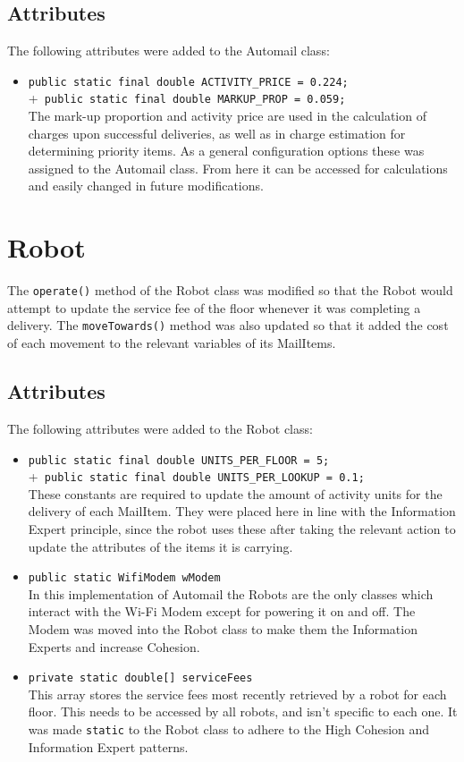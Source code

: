 \documentclass{article}
\begin{document}
\subsection{Attributes}
The following attributes were added to the Automail class:
\begin{itemize}
    \item \verb|public static final double ACTIVITY_PRICE = 0.224;|\\
         +\verb| public static final double MARKUP_PROP = 0.059;|\\[2mm]
    The mark-up proportion and activity price are used in the calculation of charges upon successful deliveries, as well as in charge estimation for determining priority items. As a general configuration options these was assigned to the Automail class. From here it can be accessed for calculations and easily changed in future modifications.
\end{itemize}

\section{Robot}
The \verb|operate()| method of the Robot class was modified so that the Robot would attempt to update the service fee of the floor whenever it was completing a delivery. The \verb|moveTowards()| method was also updated so that it added the cost of each movement to the relevant variables of its MailItems.
\subsection{Attributes}
\label{sec: robot attrs}
The following attributes were added to the Robot class:
\begin{itemize}
    \item \verb|public static final double UNITS_PER_FLOOR = 5;|\\
         +\verb| public static final double UNITS_PER_LOOKUP = 0.1;|\\[2mm]
    These constants are required to update the amount of activity units for the delivery of each MailItem. They were placed here in line with the Information Expert principle, since the robot uses these after taking the relevant action to update the attributes of the items it is carrying.
    \item \verb|public static WifiModem wModem|\\[2mm]
    In this implementation of Automail the Robots are the only classes which interact with the Wi-Fi Modem except for powering it on and off. The Modem was moved into the Robot class to make them the Information Experts and increase Cohesion.
    \item \verb|private static double[] serviceFees|\\[2mm]
    This array stores the service fees most recently retrieved by a robot for each floor. This needs to be accessed by all robots, and isn't specific to each one. It was made \verb|static| to the Robot class to adhere to the High Cohesion and Information Expert patterns.
\end{itemize}
\end{document}
